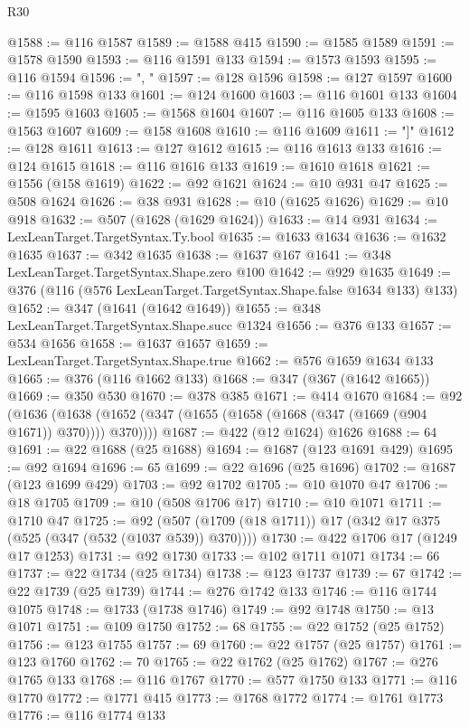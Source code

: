 \begin{lexlean}{R30}
\begin{coremodule}
@1588 := @116 @1587
@1589 := @1588 @415
@1590 := @1585 @1589
@1591 := @1578 @1590
@1593 := @116 @1591 @133
@1594 := @1573 @1593
@1595 := @116 @1594
@1596 := ", "
@1597 := @128 @1596
@1598 := @127 @1597
@1600 := @116 @1598 @133
@1601 := @124 @1600
@1603 := @116 @1601 @133
@1604 := @1595 @1603
@1605 := @1568 @1604
@1607 := @116 @1605 @133
@1608 := @1563 @1607
@1609 := @158 @1608
@1610 := @116 @1609
@1611 := "]"
@1612 := @128 @1611
@1613 := @127 @1612
@1615 := @116 @1613 @133
@1616 := @124 @1615
@1618 := @116 @1616 @133
@1619 := @1610 @1618
@1621 := @1556 (@158 @1619)
@1622 := @92 @1621
@1624 := @10 @931 @47
@1625 := @508 @1624
@1626 := @38 @931
@1628 := @10 (@1625 @1626)
@1629 := @10 @918
@1632 := @507 (@1628 (@1629 @1624))
@1633 := @14 @931
@1634 := LexLeanTarget.TargetSyntax.Ty.bool
@1635 := @1633 @1634
@1636 := @1632 @1635
@1637 := @342 @1635
@1638 := @1637 @167
@1641 := @348 LexLeanTarget.TargetSyntax.Shape.zero @100
@1642 := @929 @1635
@1649 := @376 (@116 (@576 LexLeanTarget.TargetSyntax.Shape.false @1634 @133) @133)
@1652 := @347 (@1641 (@1642 @1649))
@1655 := @348 LexLeanTarget.TargetSyntax.Shape.succ @1324
@1656 := @376 @133
@1657 := @534 @1656
@1658 := @1637 @1657
@1659 := LexLeanTarget.TargetSyntax.Shape.true
@1662 := @576 @1659 @1634 @133
@1665 := @376 (@116 @1662 @133)
@1668 := @347 (@367 (@1642 @1665))
@1669 := @350 @530
@1670 := @378 @385
@1671 := @414 @1670
@1684 := @92
    (@1636 (@1638 (@1652 (@347 (@1655 (@1658 (@1668 (@347 (@1669 (@904 @1671)) @370)))) @370))))
@1687 := @422 (@12 @1624) @1626
@1688 := 64
@1691 := @22 @1688 (@25 @1688)
@1694 := @1687 (@123 @1691 @429)
@1695 := @92 @1694
@1696 := 65
@1699 := @22 @1696 (@25 @1696)
@1702 := @1687 (@123 @1699 @429)
@1703 := @92 @1702
@1705 := @10 @1070 @47
@1706 := @18 @1705
@1709 := @10 (@508 @1706 @17)
@1710 := @10 @1071
@1711 := @1710 @47
@1725 := @92 (@507 (@1709 (@18 @1711)) @17 (@342 @17 @375 (@525 (@347 (@532 (@1037 @539)) @370))))
@1730 := @422 @1706 @17 (@1249 @17 @1253)
@1731 := @92 @1730
@1733 := @102 @1711 @1071
@1734 := 66
@1737 := @22 @1734 (@25 @1734)
@1738 := @123 @1737
@1739 := 67
@1742 := @22 @1739 (@25 @1739)
@1744 := @276 @1742 @133
@1746 := @116 @1744 @1075
@1748 := @1733 (@1738 @1746)
@1749 := @92 @1748
@1750 := @13 @1071
@1751 := @109 @1750
@1752 := 68
@1755 := @22 @1752 (@25 @1752)
@1756 := @123 @1755
@1757 := 69
@1760 := @22 @1757 (@25 @1757)
@1761 := @123 @1760
@1762 := 70
@1765 := @22 @1762 (@25 @1762)
@1767 := @276 @1765 @133
@1768 := @116 @1767
@1770 := @577 @1750 @133
@1771 := @116 @1770
@1772 := @1771 @415
@1773 := @1768 @1772
@1774 := @1761 @1773
@1776 := @116 @1774 @133

\end{coremodule}
\end{lexlean}
